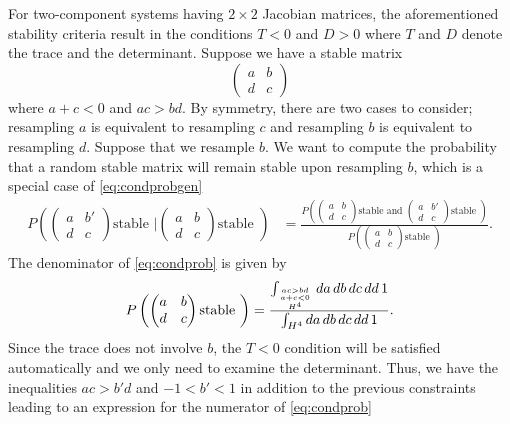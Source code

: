 For two-component systems having $2 \times 2$ Jacobian matrices, the aforementioned stability criteria result in the conditions $T < 0$ and $D >
0$ where $T$ and $D$ denote the trace and the determinant. Suppose we have a stable matrix
$$
\begin{pmatrix}
a & b \\
d & c
\end{pmatrix}
$$
where $a + c < 0$ and $ac > bd$.  By symmetry, there are two cases to consider; resampling $a$ is equivalent to resampling $c$ and resampling $b$ is equivalent to resampling $d$. Suppose that we resample $b$.  We want to compute the probability that a random stable matrix will remain stable upon resampling $b$, which is a special case of \ref{eq:condprobgen}
\begin{align}\label{eq:condprob}
P\left(\begin{pmatrix}
a & b' \\
d & c
\end{pmatrix} \textrm{stable } \bigg| \begin{pmatrix}
a & b \\
d & c
\end{pmatrix} \textrm{stable } \right)
& = \frac{P\left(\begin{pmatrix}
a & b \\
d & c
\end{pmatrix} \textrm{stable and } \begin{pmatrix}
a & b' \\
d & c
\end{pmatrix} \textrm{stable } \right)}{P\left(\begin{pmatrix}
a & b \\
d & c
\end{pmatrix} \textrm{stable } \right)}.
\end{align}
The denominator of \ref{eq:condprob} is given by
\begin{align*}
P\left(\begin{pmatrix}
a & b \\
d & c
\end{pmatrix} \textrm{stable } \right) = \frac{\int_{\genfrac{}{}{0pt}{}{\genfrac{}{}{0pt}{}{ac>bd}{a+c<0}}{H^4}} da\,db\,dc\,dd\,1}{\int_{H^4} da\,db\,dc\,dd\,1}.
\end{align*}
Since the trace does not involve $b$, the $T<0$ condition will be satisfied automatically and we only need to examine the determinant. Thus, we have the inequalities $ac > b'd$ and $-1 < b' < 1$ in addition to the previous constraints leading to an expression for the numerator of \ref{eq:condprob}
